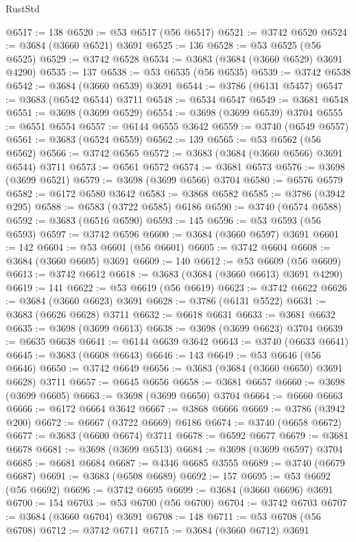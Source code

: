 \begin{lexlean}{RustStd}
\begin{coremodule}
{\begin{coremodule}
{{{{{{{{{{{{{{{{{{{{{{{{{{{{{{{{{{{{{{{{{{{{{{{@6517 := 138
@6520 := @53 @6517 (@56 @6517)
@6521 := @3742 @6520
@6524 := @3684 (@3660 @6521) @3691
@6525 := 136
@6528 := @53 @6525 (@56 @6525)
@6529 := @3742 @6528
@6534 := @3683 (@3684 (@3660 @6529) @3691 @4290)
@6535 := 137
@6538 := @53 @6535 (@56 @6535)
@6539 := @3742 @6538
@6542 := @3684 (@3660 @6539) @3691
@6544 := @3786 (@6131 @5457)
@6547 := @3683 (@6542 @6544) @3711
@6548 := @6534 @6547
@6549 := @3681 @6548
@6551 := @3698 (@3699 @6529)
@6554 := @3698 (@3699 @6539) @3704
@6555 := @6551 @6554
@6557 := @6144 @6555 @3642
@6559 := @3740 (@6549 @6557)
@6561 := @3683 (@6524 @6559)
@6562 := 139
@6565 := @53 @6562 (@56 @6562)
@6566 := @3742 @6565
@6572 := @3683 (@3684 (@3660 @6566) @3691 @6544) @3711
@6573 := @6561 @6572
@6574 := @3681 @6573
@6576 := @3698 (@3699 @6521)
@6579 := @3698 (@3699 @6566) @3704
@6580 := @6576 @6579
@6582 := @6172 @6580 @3642
@6583 := @3868 @6582
@6585 := @3786 (@3942 @295)
@6588 := @6583 (@3722 @6585) @6186
@6590 := @3740 (@6574 @6588)
@6592 := @3683 (@6516 @6590)
@6593 := 145
@6596 := @53 @6593 (@56 @6593)
@6597 := @3742 @6596
@6600 := @3684 (@3660 @6597) @3691
@6601 := 142
@6604 := @53 @6601 (@56 @6601)
@6605 := @3742 @6604
@6608 := @3684 (@3660 @6605) @3691
@6609 := 140
@6612 := @53 @6609 (@56 @6609)
@6613 := @3742 @6612
@6618 := @3683 (@3684 (@3660 @6613) @3691 @4290)
@6619 := 141
@6622 := @53 @6619 (@56 @6619)
@6623 := @3742 @6622
@6626 := @3684 (@3660 @6623) @3691
@6628 := @3786 (@6131 @5522)
@6631 := @3683 (@6626 @6628) @3711
@6632 := @6618 @6631
@6633 := @3681 @6632
@6635 := @3698 (@3699 @6613)
@6638 := @3698 (@3699 @6623) @3704
@6639 := @6635 @6638
@6641 := @6144 @6639 @3642
@6643 := @3740 (@6633 @6641)
@6645 := @3683 (@6608 @6643)
@6646 := 143
@6649 := @53 @6646 (@56 @6646)
@6650 := @3742 @6649
@6656 := @3683 (@3684 (@3660 @6650) @3691 @6628) @3711
@6657 := @6645 @6656
@6658 := @3681 @6657
@6660 := @3698 (@3699 @6605)
@6663 := @3698 (@3699 @6650) @3704
@6664 := @6660 @6663
@6666 := @6172 @6664 @3642
@6667 := @3868 @6666
@6669 := @3786 (@3942 @200)
@6672 := @6667 (@3722 @6669) @6186
@6674 := @3740 (@6658 @6672)
@6677 := @3683 (@6600 @6674) @3711
@6678 := @6592 @6677
@6679 := @3681 @6678
@6681 := @3698 (@3699 @6513)
@6684 := @3698 (@3699 @6597) @3704
@6685 := @6681 @6684
@6687 := @4346 @6685 @3555
@6689 := @3740 (@6679 @6687)
@6691 := @3683 (@6508 @6689)
@6692 := 157
@6695 := @53 @6692 (@56 @6692)
@6696 := @3742 @6695
@6699 := @3684 (@3660 @6696) @3691
@6700 := 154
@6703 := @53 @6700 (@56 @6700)
@6704 := @3742 @6703
@6707 := @3684 (@3660 @6704) @3691
@6708 := 148
@6711 := @53 @6708 (@56 @6708)
@6712 := @3742 @6711
@6715 := @3684 (@3660 @6712) @3691
}}}}}}}}}}}}}}}}}}}}}}}}}}}}}}}}}}}}}}}}}}}}}}}
\end{coremodule}}
\end{coremodule}
\end{lexlean}
